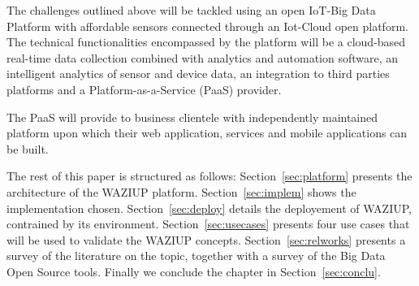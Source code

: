 The challenges outlined above will be tackled using an open IoT-Big Data Platform with affordable sensors connected through an Iot-Cloud open platform. 
The technical functionalities encompassed by the platform will be a cloud-based real-time data collection combined with analytics and automation software, an intelligent analytics of sensor and device data, an integration to third parties platforms and a Platform-as-a-Service (PaaS) provider.

The PaaS will provide to business clientele with independently maintained platform upon which their web application, services and mobile applications can be built. 

The rest of this paper is structured as follows: Section~\ref{sec:platform} presents the architecture of the WAZIUP platform. 
Section~\ref{sec:implem} shows the implementation chosen. 
Section~\ref{sec:deploy} details the deployement of WAZIUP, contrained by its environment.
Section~\ref{sec:usecases} presents four use cases that will be used to validate the WAZIUP concepts.
Section~\ref{sec:relworks} presents a survey of the literature on the topic, together with a survey of the Big Data Open Source tools.
Finally we conclude the chapter in Section~\ref{sec:conclu}.
